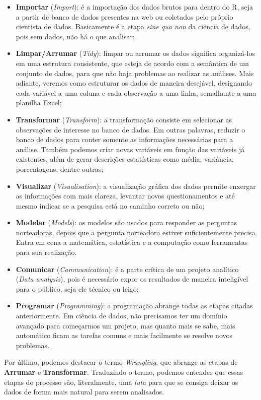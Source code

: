 \documentclass[
  brazilian,
]{book}
\begin{document}
\begin{itemize}
\item
  \textbf{Importar} (\emph{Import}): é a importação dos dados brutos para dentro do R, seja a partir de banco de dados presentes na web ou coletados pelo próprio cientista de dados. Basicamente é a etapa \emph{sine qua non} da ciência de dados, pois sem dados, não há o que analisar;
\item
  \textbf{Limpar/Arrumar} (\emph{Tidy}): limpar ou arrumar os dados significa organizá-los em uma estrutura consistente, que esteja de acordo com a semântica de um conjunto de dados, para que não haja problemas ao realizar as análises. Mais adiante, veremos como estruturar os dados de maneira desejável, designando cada variável a uma coluna e cada observação a uma linha, semalhante a uma planilha Excel;
\item
  \textbf{Transformar} (\emph{Transform}): a transformação consiste em selecionar as observações de interesse no banco de dados. Em outras palavras, reduzir o banco de dados para conter somente as informações necessárias para a análise. Também podemos criar novas variáveis em função das variáveis já existentes, além de gerar descrições estatísticas como média, variância, porcentagens, dentre outras;
\item
  \textbf{Visualizar} (\emph{Visualisation}): a visualização gráfica dos dados permite enxergar as informações com mais clareza, levantar novos questionamentos e até mesmo indicar se a pesquisa está no caminho correto ou não;
\item
  \textbf{Modelar} (\emph{Models}): os modelos são usados para responder as perguntas norteadoras, depois que a pergunta norteadora estiver suficientemente precisa. Entra em cena a matemática, estatística e a computação como ferramentas para sua realização.
\item
  \textbf{Comunicar} (\emph{Communication}): é a parte crítica de um projeto analítico (\emph{Data analysis}), pois é necessário expor os resultados de maneira inteligível para o público, seja ele técnico ou leigo;
\item
  \textbf{Programar} (\emph{Programming}): a programação abrange todas as etapas citadas anteriormente. Em ciência de dados, não precisamos ter um domínio avançado para começarmos um projeto, mas quanto mais se sabe, mais automático ficam as tarefas comuns e mais facilmente se resolve novos problemas.
\end{itemize}

Por último, podemos destacar o termo \emph{Wrangling}, que abrange as etapas de \textbf{Arrumar} e \textbf{Transformar}. Traduzindo o termo, podemos entender que essas etapas do processo são, literalmente, uma \emph{luta} para que se consiga deixar os dados de forma mais natural para serem analisados.
\end{document}
